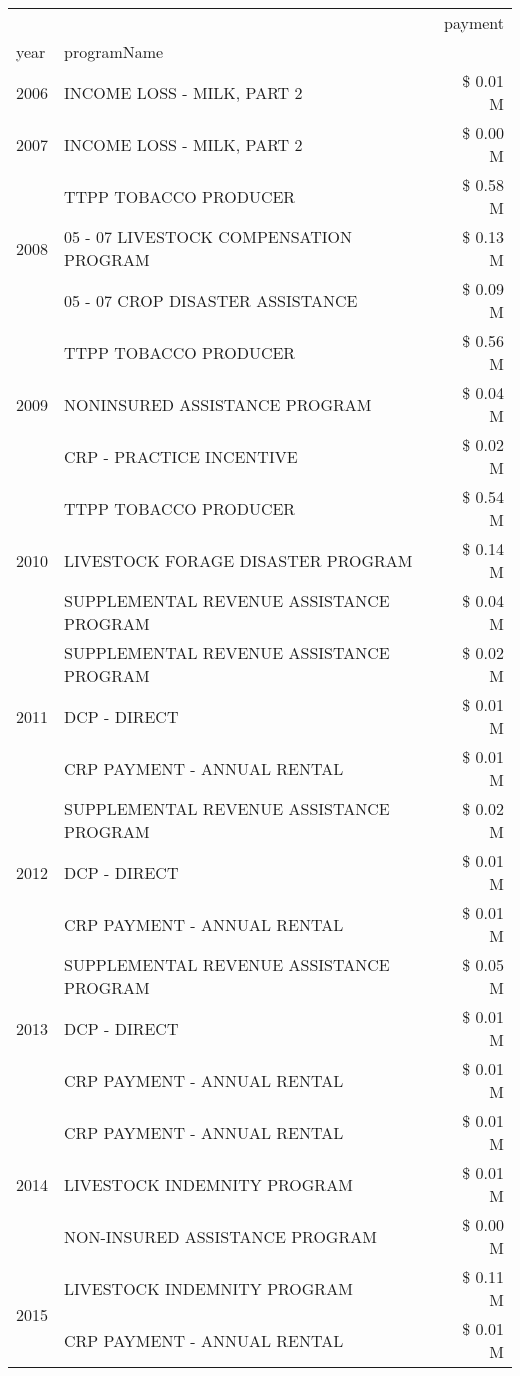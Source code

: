 \begin{tabular}{llr}
\toprule
 &  & payment \\
year & programName &  \\
\midrule
2006 & INCOME LOSS - MILK, PART 2 & \$ 0.01 M \\
\cline{1-3}
2007 & INCOME LOSS - MILK, PART 2 & \$ 0.00 M \\
\cline{1-3}
\multirow[t]{3}{*}{2008} & TTPP TOBACCO PRODUCER & \$ 0.58 M \\
 & 05 - 07 LIVESTOCK COMPENSATION PROGRAM & \$ 0.13 M \\
 & 05 - 07 CROP DISASTER ASSISTANCE & \$ 0.09 M \\
\cline{1-3}
\multirow[t]{3}{*}{2009} & TTPP TOBACCO PRODUCER & \$ 0.56 M \\
 & NONINSURED ASSISTANCE PROGRAM & \$ 0.04 M \\
 & CRP - PRACTICE INCENTIVE & \$ 0.02 M \\
\cline{1-3}
\multirow[t]{3}{*}{2010} & TTPP TOBACCO PRODUCER & \$ 0.54 M \\
 & LIVESTOCK FORAGE DISASTER  PROGRAM & \$ 0.14 M \\
 & SUPPLEMENTAL REVENUE ASSISTANCE PROGRAM & \$ 0.04 M \\
\cline{1-3}
\multirow[t]{3}{*}{2011} & SUPPLEMENTAL REVENUE ASSISTANCE PROGRAM & \$ 0.02 M \\
 & DCP - DIRECT & \$ 0.01 M \\
 & CRP PAYMENT - ANNUAL RENTAL & \$ 0.01 M \\
\cline{1-3}
\multirow[t]{3}{*}{2012} & SUPPLEMENTAL REVENUE ASSISTANCE PROGRAM & \$ 0.02 M \\
 & DCP - DIRECT & \$ 0.01 M \\
 & CRP PAYMENT - ANNUAL RENTAL & \$ 0.01 M \\
\cline{1-3}
\multirow[t]{3}{*}{2013} & SUPPLEMENTAL REVENUE ASSISTANCE PROGRAM & \$ 0.05 M \\
 & DCP - DIRECT & \$ 0.01 M \\
 & CRP PAYMENT - ANNUAL RENTAL & \$ 0.01 M \\
\cline{1-3}
\multirow[t]{3}{*}{2014} & CRP PAYMENT - ANNUAL RENTAL & \$ 0.01 M \\
 & LIVESTOCK INDEMNITY PROGRAM & \$ 0.01 M \\
 & NON-INSURED ASSISTANCE PROGRAM & \$ 0.00 M \\
\cline{1-3}
\multirow[t]{3}{*}{2015} & LIVESTOCK INDEMNITY PROGRAM & \$ 0.11 M \\
 & CRP PAYMENT - ANNUAL RENTAL & \$ 0.01 M \\

\end{tabular}
